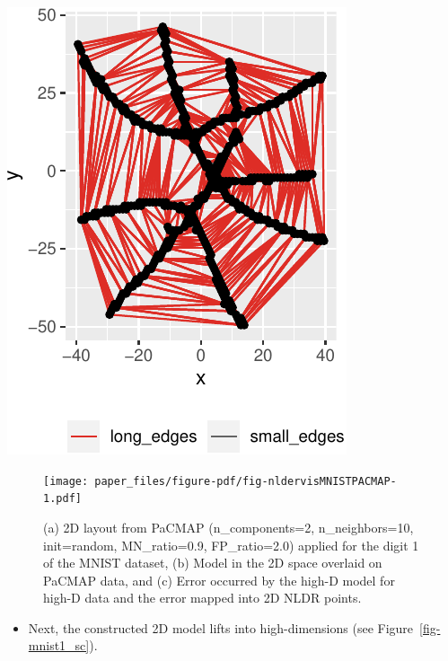 \documentclass[
  12pt]{article}
\providecommand{\tightlist}{%
  \setlength{\itemsep}{0pt}\setlength{\parskip}{0pt}}\usepackage{longtable,booktabs,array}
\begin{document}
\includegraphics{paper_files/figure-pdf/unnamed-chunk-87-1.pdf}

\begin{figure}[H]

{\centering \texttt{[image: paper\_files/figure-pdf/fig-nldervisMNISTPACMAP-1.pdf]}

}

\caption{\label{fig-nldervisMNISTPACMAP}(a) 2D layout from PaCMAP
(n\_components=2, n\_neighbors=10, init=random, MN\_ratio=0.9,
FP\_ratio=2.0) applied for the digit 1 of the MNIST dataset, (b) Model
in the 2D space overlaid on PaCMAP data, and (c) Error occurred by the
high-D model for high-D data and the error mapped into 2D NLDR points.}

\end{figure}

\begin{itemize}
\tightlist
\item
  Next, the constructed 2D model lifts into high-dimensions (see
  Figure~\ref{fig-mnist1_sc}).
\end{itemize}
\end{document}
